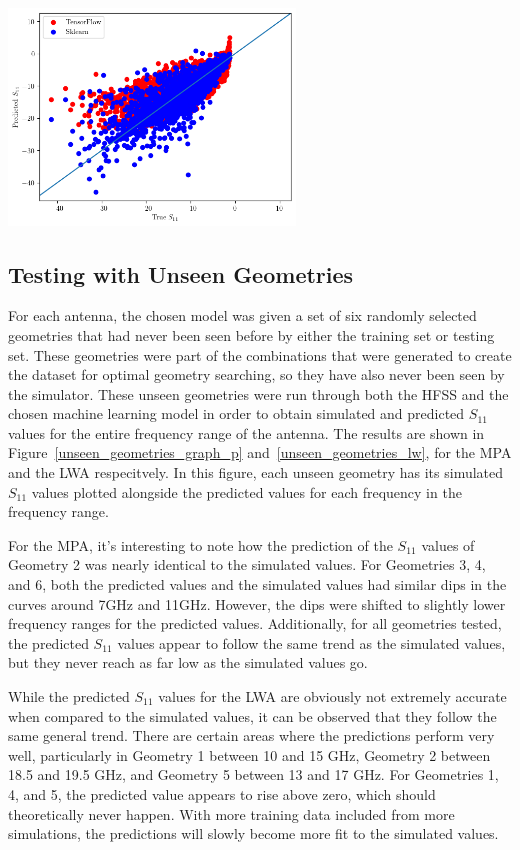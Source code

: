\documentclass[conference]{IEEEtran}
\newenvironment{Figure}
    {\par\medskip\noindent\minipage{\linewidth}}
    {\endminipage\par\medskip}
\begin{document}
\begin{Figure}
    \centering
    \includegraphics[width=3in]{actual_vs_predicted_s11_leaky_wave}
    \label{actual_vs_predicted_s11_leaky_wave}
\end{Figure}

\subsection{Testing with Unseen Geometries}
For each antenna, the chosen model was given a set of six randomly selected geometries that had never been seen before by either the training set or testing set. These geometries were part of the combinations that were generated to create the dataset for optimal geometry searching, so they have also never been seen by the simulator. These unseen geometries were run through both the HFSS and the chosen machine learning model in order to obtain simulated and predicted $S_{11}$ values for the entire frequency range of the antenna. The results are shown in Figure~\ref{unseen_geometries_graph_p} and~\ref{unseen_geometries_lw}, for the MPA and the LWA respecitvely. In this figure, each unseen geometry has its simulated $S_{11}$ values plotted alongside the predicted values for each frequency in the frequency range.

For the MPA, it's interesting to note how the prediction of the $S_{11}$ values of Geometry 2 was nearly identical to the simulated values. For Geometries 3, 4, and 6, both the predicted values and the simulated values had similar dips in the curves around 7GHz and 11GHz. However, the dips were shifted to slightly lower frequency ranges for the predicted values. Additionally, for all geometries tested, the predicted $S_{11}$ values appear to follow the same trend as the simulated values, but they never reach as far low as the simulated values go. 

While the predicted $S_{11}$ values for the LWA are obviously not extremely accurate when compared to the simulated values, it can be observed that they follow the same general trend. There are certain areas where the predictions perform very well, particularly in Geometry 1 between 10 and 15 GHz, Geometry 2 between 18.5 and 19.5 GHz, and Geometry 5 between 13 and 17 GHz. For Geometries 1, 4, and 5, the predicted value appears to rise above zero, which should theoretically never happen. With more training data included from more simulations, the predictions will slowly become more fit to the simulated values. 
\end{document}
